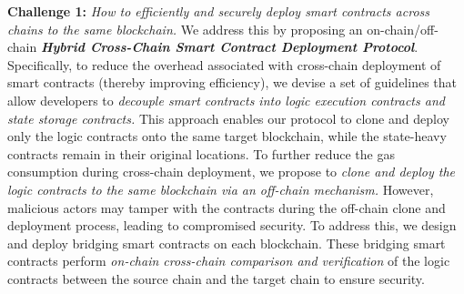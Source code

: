 \vspace{3pt}
\noindent
\textbf{Challenge 1: }
\textit{How to efficiently and securely deploy smart contracts across chains to the same blockchain.}
We address this by proposing an on-chain/off-chain \textbf{\emph{Hybrid Cross-Chain Smart Contract Deployment Protocol}}.
Specifically, to reduce the overhead associated with cross-chain deployment of smart contracts (thereby improving efficiency), we devise a set of guidelines that allow developers to \emph{decouple smart contracts into logic execution contracts and state storage contracts. }
This approach enables our protocol to clone and deploy only the logic contracts onto the same target blockchain, while the state-heavy contracts remain in their original locations.
To further reduce the gas consumption during cross-chain deployment, we propose to \emph{clone and deploy the logic contracts to the same blockchain via an off-chain mechanism.}
However, malicious actors may tamper with the contracts during the off-chain clone and deployment process, leading to compromised security. 
To address this, we design and deploy bridging smart contracts on each blockchain. 
These bridging smart contracts perform \emph{on-chain cross-chain comparison and verification} of the logic contracts between the source chain and the target chain to ensure security.

